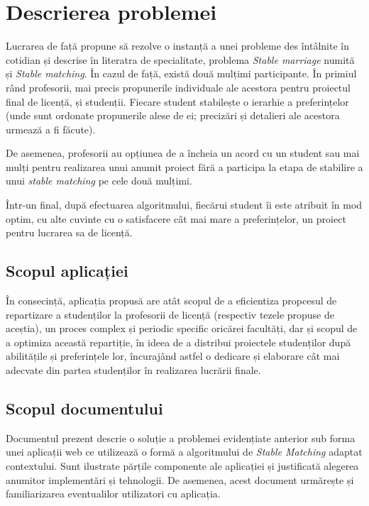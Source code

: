 \chapter{Descrierea problemei}
Lucrarea de față propune să rezolve o instanță a unei probleme des întâlnite în cotidian și descrise în literatra de specialitate, problema \textit{Stable marriage} numită și \textit{Stable matching}. În cazul de față, există două mulțimi participante. În primiul rând profesorii, mai precis propunerile individuale ale acestora pentru proiectul final de licență, și studenții. Fiecare student stabilește o ierarhie a preferințelor (unde sunt ordonate propunerile alese de ei; precizări și detalieri ale acestora urmează a fi făcute).

De asemenea, profesorii au opțiunea de a încheia un acord cu un student sau mai mulți pentru realizarea unui anumit proiect fără a participa la etapa de stabilire a unui \textit{stable matching} pe cele două mulțimi.

Într-un final, după efectuarea algoritmului, fiecărui student îi este atribuit în mod optim, cu alte cuvinte cu o satisfacere cât mai mare a preferințelor, un proiect pentru lucrarea sa de licență.

\section{Scopul aplicației}

În consecință, aplicația propusă are atât scopul de a eficientiza propcesul de repartizare a studenților la profesorii de licență (respectiv tezele propuse de aceștia), un proces complex și periodic specific oricărei facultăți, dar și scopul de a optimiza această repartiție, în ideea de a distribui proiectele studenților după abilitățile și preferințele lor, încurajând astfel o dedicare și elaborare cât mai adecvate din partea studenților în realizarea lucrării finale.

\section{Scopul documentului}

Documentul prezent descrie o soluție a problemei evidențiate anterior sub forma unei aplicații web ce utilizează o formă a algoritmului de \textit{Stable Matching} adaptat contextului. Sunt ilustrate părțile componente ale aplicației și justificată alegerea anumitor implementări și tehnologii. De asemenea, acest document urmărește și familiarizarea eventualilor utilizatori cu aplicația.

